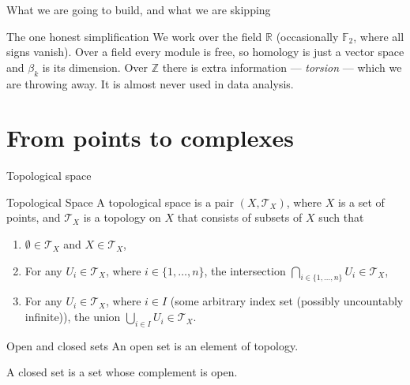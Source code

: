 \documentclass[10pt,aspectratio=169]{beamer}
\newcommand{\R}{\mathbb{R}}
\newcommand{\bF}{\mathbb{F}}
\newcommand{\Tau}{\mathcal{T}}  %
\begin{document}
\begin{frame}[shrink=15]{What we are going to build, and what we are skipping}
        \vspace{0.4em}

        \begin{alertblock}{The one honest simplification}
            We work over the field $\R$ (occasionally $\bF_2$, where all signs vanish).
            Over a field every module is free, so homology is just a vector space and $\beta_k$ is its dimension.
            Over $\mathbb{Z}$ there is extra information --- \emph{torsion} --- which we are throwing away.
            It is almost never used in data analysis.
        \end{alertblock}
    \end{frame}

    \section{From points to complexes}

    \begin{frame}[shrink=8]{Topological space}
        \begin{block}{Topological Space}
            A topological space is a pair $(X, \Tau_X)$, where $X$ is a set of points, and $\Tau_X$ is a topology on $X$ that consists of subsets of $X$ such that
            \begin{enumerate}
                \item $\emptyset \in \Tau_X$ and $X\in\Tau_X$,
                \item For any $U_i\in\Tau_X$, where $i\in\{1,\dots,n\}$, the intersection $\bigcap_{i\in\{1,\dots,n\}}U_i\in\Tau_X$,
                \item For any $U_i\in\Tau_X$, where $i\in I$ (some arbitrary index set (possibly uncountably infinite)), the union $\bigcup_{i\in I}U_i\in\Tau_X$.
            \end{enumerate}
        \end{block}
        \begin{block}{Open and closed sets}
            An open set is an element of topology.

            A closed set is a set whose complement is open.
        \end{block}
    \end{frame}
\end{document}
